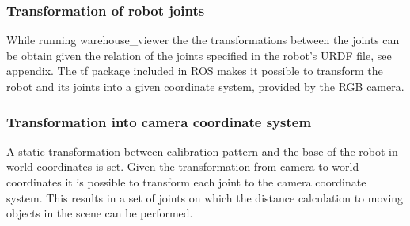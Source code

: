 \subsubsection{Transformation of robot joints}
While running warehouse\_viewer the the transformations between the joints can be obtain given the relation of the joints specified in the robot’s URDF file, see appendix. The tf package included in ROS makes it possible to transform the robot and its joints into a given coordinate system, provided by the RGB camera.

\subsubsection{Transformation into camera coordinate system}
A static transformation between calibration pattern and the base of the robot in world coordinates is set. Given the transformation from camera to world coordinates it is possible to transform each joint to the camera coordinate system. This results in a set of joints on which the distance calculation to moving objects in the scene can be performed. 
